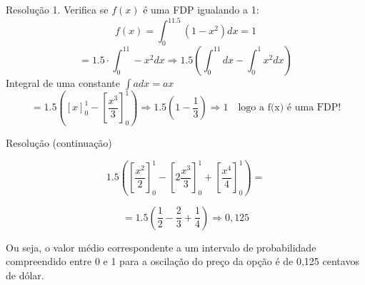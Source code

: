 \documentclass{beamer}
\begin{document}
\begin{frame}{Resolução}
\footnotesize
1. Verifica se $f(x)$ é uma FDP igualando a 1:
$$
f(x)=\int _0^11.5\left(1-x^2\right)dx = 1
$$    
$$
=1.5\cdot \int _0^11-x^2dx\Rightarrow 1.5\left(\int _0^11dx-\int _0^1x^2dx\right)
$$
Integral de uma constante $\int adx=ax$   
 $$
 =1.5\left(\left[ x \right]_{0}^{1} - \left[\frac{x^3}{3}\right]^{1}_{0} \right)\Rightarrow 1.5\left(1-\frac{1}{3}\right)\Rightarrow 1 \quad \mbox{logo a f(x) é uma FDP!}
 $$
    
    
\end{frame}
\begin{frame}{Resolução (continuação)}
\footnotesize

$$
1.5\left(\left[\frac{x^2}{2}\right]^{1}_{0}-\left[2\frac{x^3}{3}\right]^{1}_{0}+\left[\frac{x^4}{4}\right]^{1}_{0}\right)=
$$

$$
=1.5\left(\frac{1}{2}-\frac{2}{3}+\frac{1}{4}\right)\Rightarrow 0,125
$$

Ou seja, o valor médio correspondente a um intervalo de probabilidade compreendido entre 0 e 1 para a oscilação do preço da opção é de 0,125 centavos de dólar.
\end{frame}
\end{document}
